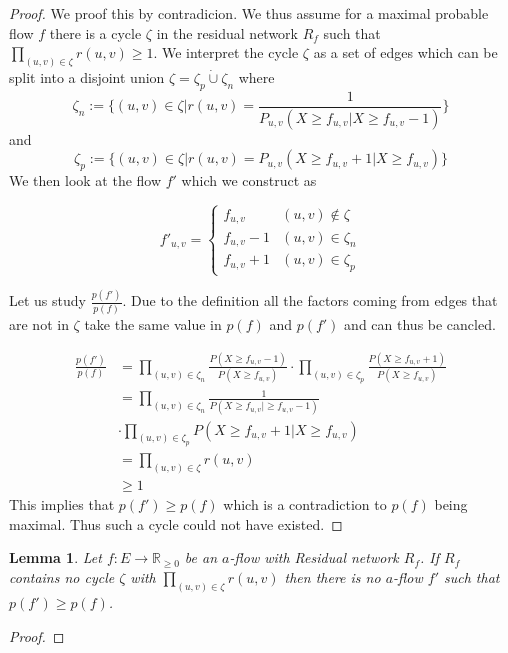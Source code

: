 \documentclass[10pt,twocolumn]{article}
\newtheorem{lemma}[theorem]{Lemma}
\begin{document}
\begin{proof}
  We proof this by contradicion.
  We thus assume for a maximal probable flow $f$ there is a cycle $\zeta$ in the residual network $R_f$ such that $\displaystyle\prod_{(u,v)\in\zeta}r(u,v) \geq 1$.
  We interpret the cycle $\zeta$ as a set of edges which can be split into a disjoint union $\zeta = \zeta_p \mathbin{\dot{\cup}} \zeta_n$ where
  \[
  \zeta_n:=\{(u,v) \in\zeta | r(u,v)=\frac{1}{P_{u,v}(X\geq f_{u,v}| X \geq f_{u,v}-1)}\}
  \]
  and
  \[
  \zeta_p:=\{(u,v) \in\zeta | r(u,v)=P_{u,v}(X\geq f_{u,v}+1| X \geq f_{u,v})\}
  \]
  We then look at the flow $f'$ which we construct as

  \[
f'_{u,v} =
  \begin{cases}
    f_{u,v} & (u,v)\not\in\zeta \\
    f_{u,v} - 1 & (u,v)\in\zeta_n \\
    f_{u,v} + 1 & (u,v)\in\zeta_p
  \end{cases}
  \]

  Let us study $\frac{p(f')}{p(f)}$. Due to the definition all the factors coming from edges that are not in $\zeta$ take the same value in $p(f)$ and $p(f')$ and can thus be cancled.

  \[
  \begin{aligned}
    \frac{p(f')}{p(f)} & = \prod_{(u,v)\in\zeta_n}\frac{P(X\geq f_{u,v}-1)}{P(X\geq f_{u,v})}\cdot\prod_{(u,v)\in\zeta_p}\frac{P(X\geq f_{u,v}+1)}{P(X\geq f_{u,v})} \\
    & = \prod_{(u,v)\in\zeta_n}\frac{1}{P(X\geq f_{u,v} | \geq f_{u,v} -1)} \\
    & \cdot\prod_{(u,v)\in\zeta_p}P(X\geq f_{u,v}+1|X\geq f_{u,v}) \\
    & = \prod_{(u,v)\in\zeta}r(u,v) \\
    & \geq  1
    \end{aligned}
  \]
  This implies that $p(f') \geq p(f)$ which is a contradiction to $p(f)$ being maximal.
  Thus such a cycle could not have existed.
\end{proof}

\begin{lemma}
  Let $f:E\longrightarrow \mathbb{R}_{\geq 0}$ be an $a$-flow with Residual network $R_f$.
  If $R_f$ contains no cycle $\zeta$ with $\prod_{(u,v)\in\zeta}r(u,v)$ then there is no $a$-flow $f'$ such that $p(f')\geq p(f)$.
\end{lemma}

\begin{proof}

\end{proof}
\end{document}
